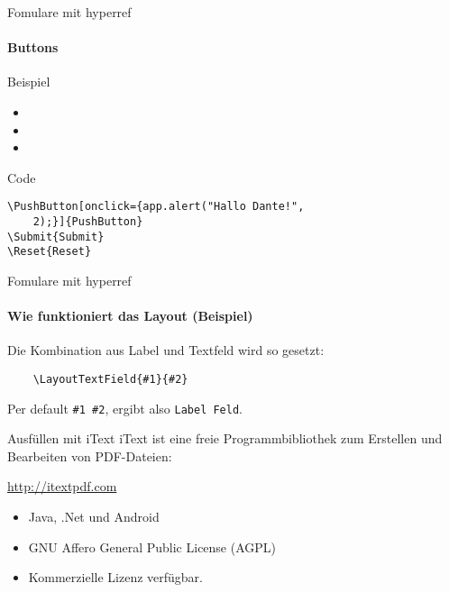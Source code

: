 \documentclass{beamer}
\begin{document}
\begin{frame}[fragile]{Fomulare mit hyperref}
\framesubtitle{Buttons}
\begin{block}{Beispiel}
\begin{Form}[action=http://example.com]
\begin{itemize}
	\item {}
	\item {}
	\item {}
\end{itemize}
\end{Form}
\end{block}
\begin{block}{Code}
\begin{verbatim}
\PushButton[onclick={app.alert("Hallo Dante!",
    2);}]{PushButton}
\Submit{Submit}
\Reset{Reset}
\end{verbatim}
\end{block}

\end{frame}

\begin{frame}[fragile]{Fomulare mit hyperref}
\framesubtitle{Wie funktioniert das Layout (Beispiel)}
Die Kombination aus Label und Textfeld wird so gesetzt:
\begin{verbatim}
    \LayoutTextField{#1}{#2}
\end{verbatim}

Per default \verb|#1 #2|, ergibt also \texttt{Label Feld}.

\end{frame}


\begin{frame}{Ausfüllen mit iText}
iText ist eine freie Programmbibliothek zum Erstellen und Bearbeiten von PDF-Dateien:
\begin{center}
	\url{http://itextpdf.com}
\end{center}
\begin{itemize}
	\item Java, .Net und Android
	\item GNU Affero General Public License (AGPL)
	\item Kommerzielle Lizenz verfügbar.
\end{itemize}
\end{frame}
\end{document}

